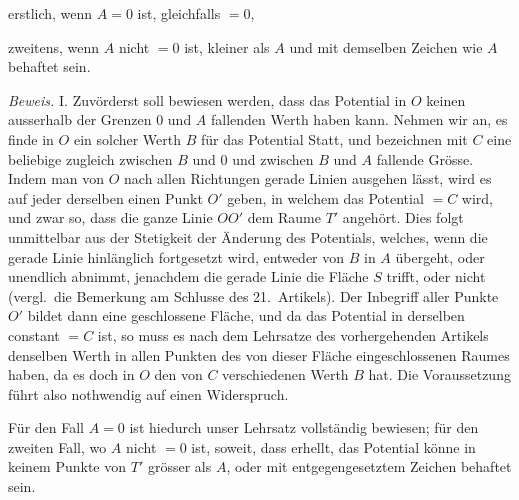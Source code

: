 \noindent erstlich, wenn $A=0$ ist, gleichfalls $=0$,

\noindent zweitens, wenn $A$ nicht $=0$ ist, kleiner als $A$ und mit demselben Zeichen wie $A$ behaftet sein.

\textit{Beweis.} I. Zuvörderst soll bewiesen werden, dass das Potential in $O$ keinen ausserhalb der Grenzen $0$ und $A$ fallenden Werth haben kann. Nehmen wir an, es finde in $O$ ein solcher Werth $B$ für das Potential Statt, und bezeichnen mit $C$ eine beliebige zugleich zwischen $B$ und $0$ und zwischen $B$ und $A$ fallende Grösse. Indem man von $O$ nach allen Richtungen gerade Linien ausgehen lässt, wird es auf jeder derselben einen Punkt $O'$ geben, in welchem das Potential $=C$ wird, und zwar so, dass die ganze Linie $OO'$ dem Raume $T'$ angehört. Dies folgt unmittelbar aus der Stetigkeit der Änderung des Potentials, welches, wenn die gerade Linie hinlänglich fortgesetzt wird, entweder von $B$ in $A$ übergeht, oder unendlich abnimmt, jenachdem die gerade Linie die Fläche $S$ trifft, oder nicht (vergl.\ die Bemerkung am Schlusse des 21.\ Artikels). Der Inbegriff aller Punkte $O'$ bildet dann eine geschlossene Fläche, und da das Potential in derselben constant $=C$ ist, so muss es nach dem Lehrsatze des vorhergehenden Artikels denselben Werth in allen Punkten des von dieser Fläche eingeschlossenen Raumes haben, da es doch in $O$ den von $C$ verschiedenen Werth $B$ hat. Die Voraussetzung führt also nothwendig auf einen Widerspruch.

Für den Fall $A=0$ ist hiedurch unser Lehrsatz vollständig bewiesen; für den zweiten Fall, wo $A$ nicht $=0$ ist, soweit, dass erhellt, das Potential könne in keinem Punkte von $T'$ grösser als $A$, oder mit entgegengesetztem Zeichen behaftet sein.

